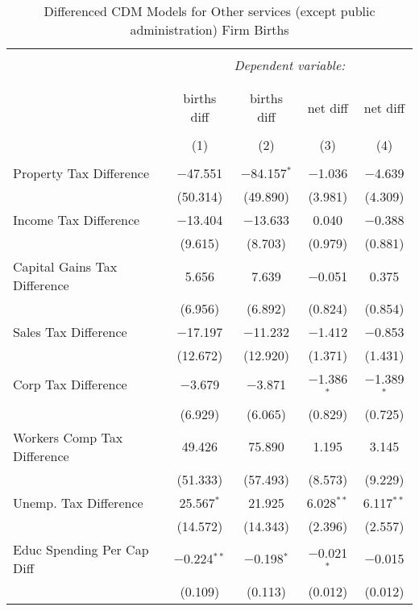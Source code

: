 
\begin{table}[!htbp] \centering 
  \caption{Differenced CDM Models for  Other services (except public administration) Firm Births} 
  \label{} 
\begin{tabular}{@{\extracolsep{5pt}}lcccc} 
\\[-1.8ex]\hline 
\hline \\[-1.8ex] 
 & \multicolumn{4}{c}{\textit{Dependent variable:}} \\ 
\cline{2-5} 
\\[-1.8ex] & \multicolumn{4}{c}{ } \\ 
 & births diff & births diff & net diff & net diff \\ 
\\[-1.8ex] & (1) & (2) & (3) & (4)\\ 
\hline \\[-1.8ex] 
 Property Tax Difference & $-$47.551 & $-$84.157$^{*}$ & $-$1.036 & $-$4.639 \\ 
  & (50.314) & (49.890) & (3.981) & (4.309) \\ 
  Income Tax Difference & $-$13.404 & $-$13.633 & 0.040 & $-$0.388 \\ 
  & (9.615) & (8.703) & (0.979) & (0.881) \\ 
  Capital Gains Tax Difference & 5.656 & 7.639 & $-$0.051 & 0.375 \\ 
  & (6.956) & (6.892) & (0.824) & (0.854) \\ 
  Sales Tax Difference & $-$17.197 & $-$11.232 & $-$1.412 & $-$0.853 \\ 
  & (12.672) & (12.920) & (1.371) & (1.431) \\ 
  Corp Tax Difference & $-$3.679 & $-$3.871 & $-$1.386$^{*}$ & $-$1.389$^{*}$ \\ 
  & (6.929) & (6.065) & (0.829) & (0.725) \\ 
  Workers Comp Tax Difference & 49.426 & 75.890 & 1.195 & 3.145 \\ 
  & (51.333) & (57.493) & (8.573) & (9.229) \\ 
  Unemp. Tax Difference & 25.567$^{*}$ & 21.925 & 6.028$^{**}$ & 6.117$^{**}$ \\ 
  & (14.572) & (14.343) & (2.396) & (2.557) \\ 
  Educ Spending Per Cap Diff & $-$0.224$^{**}$ & $-$0.198$^{*}$ & $-$0.021$^{*}$ & $-$0.015 \\ 
  & (0.109) & (0.113) & (0.012) & (0.012) \\ 

\end{tabular}
\end{table}
